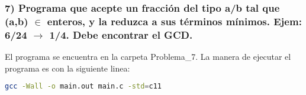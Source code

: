 \subsubsection*{7) Programa que acepte un fracción del tipo a/b tal que (a,b) $\in$ enteros, y la reduzca a sus términos mínimos. Ejem: 6/24 $\rightarrow$ 1/4. Debe encontrar el GCD.}

El programa se encuentra en la carpeta \textcolor{citecolor}{Problema\_7}. La manera de ejecutar el programa es con la siguiente linea:
\begin{lstlisting}[language=bash]
    gcc -Wall -o main.out main.c -std=c11
\end{lstlisting}